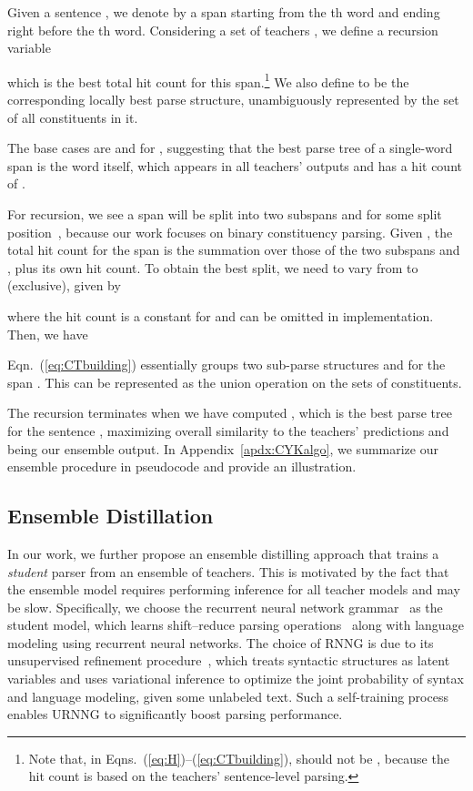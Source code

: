 \documentclass{article}
\begin{document}
Given a sentence , we denote by  a span starting from the th word and ending right before the th word. Considering a set of teachers , we define a recursion variable 

which is the best total hit count for this span.\footnote{Note that, in Eqns.~(\ref{eq:H})--(\ref{eq:CTbuilding}),  should not be , because the hit count is based on the teachers' sentence-level parsing.} We also define  to be the corresponding locally best parse structure, unambiguously represented by the set of all constituents in it.

The base cases are  and  for , suggesting that the best parse tree of a single-word span is the word itself, which appears in all teachers' outputs and has a hit count of .

For recursion, we see a span  will be split into two subspans  and  for some split position~, because our work focuses on binary constituency parsing. Given , the total hit count for the span  is the summation over those of the two subspans  and , plus its own hit count. To obtain the best split, we need to vary  from  to  (exclusive), given by

where the hit count is a constant for  and can be omitted in implementation. Then, we have

Eqn.~(\ref{eq:CTbuilding}) essentially groups two sub-parse structures  and  for the span . This can be represented as the union operation on the sets of constituents.

The recursion terminates when we have computed , which is the best parse tree for the sentence , maximizing overall similarity to the teachers' predictions and being our ensemble output.
In Appendix~\ref{apdx:CYKalgo}, we summarize our ensemble procedure in pseudocode and provide an illustration. 

\subsection{Ensemble Distillation}
\label{sec:ensembledistillation}

In our work, we further propose an ensemble distilling approach that trains a \textit{student} parser from an ensemble of teachers. This is motivated by the fact that the ensemble model requires performing inference for all teacher models and may be slow.
Specifically, we choose the recurrent neural network grammar~\citep[RNNG;][]{dyer-etal-2016-recurrent} as the student model, which learns shift--reduce parsing operations~\citep{shiftreduce} along with language modeling using recurrent neural networks.  The choice of RNNG is due to its unsupervised refinement procedure~\citep[URNNG;][]{kim-etal-2019-unsupervised}, which treats syntactic structures as latent variables and uses variational inference to optimize the joint probability of syntax and language modeling, given some unlabeled text. Such a self-training process enables URNNG to significantly boost parsing performance. 
\end{document}
